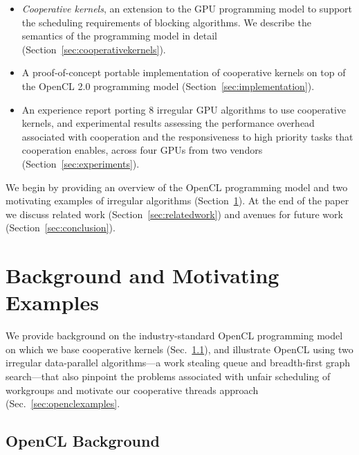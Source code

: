 \documentclass[numbers,nocopyrightspace,10pt]{sigplanconf}
\newcommand{\mysec}{Sec.~}
\newcommand{\NumAlgorithms}{8}
\begin{document}
\begin{itemize}

\item \emph{Cooperative kernels}, an extension to the GPU programming model to support the scheduling requirements of blocking algorithms.  We describe the semantics of the programming model in detail (Section~\ref{sec:cooperativekernels}). 

\item A proof-of-concept portable implementation of cooperative
  kernels on top of the OpenCL 2.0 programming model
  (Section~\ref{sec:implementation}).

\item An experience report porting \NumAlgorithms{} irregular GPU
  algorithms to use cooperative kernels, and experimental results
  assessing the performance overhead associated with cooperation and
  the responsiveness to high priority tasks that cooperation enables,
  across four GPUs from two vendors (Section~\ref{sec:experiments}).

\end{itemize}

We begin by providing an overview of the OpenCL programming model and
two motivating examples of irregular algorithms (Section~\ref{sec:background}).  At the end of the paper we discuss related work (Section~\ref{sec:relatedwork}) and avenues for future work (Section~\ref{sec:conclusion}).

\section{Background and Motivating Examples}\label{sec:background}

We provide background on the industry-standard OpenCL programming
model on which we base cooperative kernels (\mysec\ref{sec:opencl}),
and illustrate OpenCL using two irregular data-parallel algorithms---a
work stealing queue and breadth-first graph search---that also
pinpoint the problems associated with unfair scheduling of workgroups
and motivate our cooperative threads approach (\mysec\ref{sec:openclexamples}.

\subsection{OpenCL Background}\label{sec:opencl}

\end{document}
